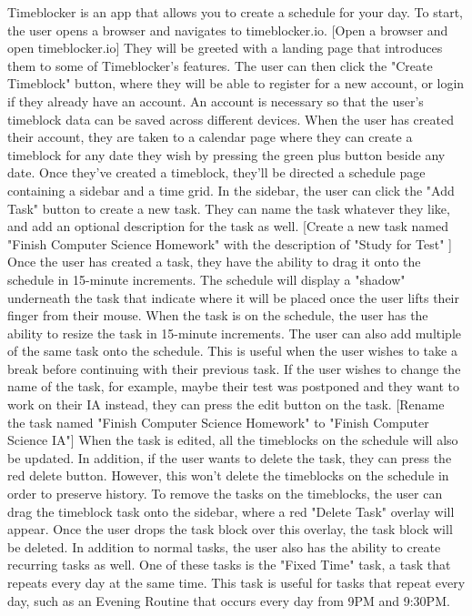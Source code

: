 \documentclass[notitlepage]{report}
\begin{document}
\obeylines
Timeblocker is an app that allows you to create a schedule for your day.
To start, the user opens a browser and navigates to timeblocker.io.
[Open a browser and open timeblocker.io]
They will be greeted with a landing page that introduces them to some of Timeblocker's features.
The user can then click the "Create Timeblock" button, where they will be able to register for a new account, or login if they already have an account.
An account is necessary so that the user's timeblock data can be saved across different devices.
When the user has created their account, they are taken to a calendar page where they can create a timeblock for any date they wish by pressing the green plus button beside any date.
Once they've created a timeblock, they'll be directed a schedule page containing a sidebar and a time grid. In the sidebar, the user can click the "Add Task" button to create a new task. They can name the task whatever they like, and add an optional description for the task as well.
[Create a new task named "Finish Computer Science Homework" with the description of "Study for Test" ]
Once the user has created a task, they have the ability to drag it onto the schedule in 15-minute increments. The schedule will display a "shadow" underneath the task that indicate where it will be placed once the user lifts their finger from their mouse. When the task is on the schedule, the user has the ability to resize the task in 15-minute increments.
The user can also add multiple of the same task onto the schedule. This is useful when the user wishes to take a break before continuing with their previous task.
If the user wishes to change the name of the task, for example, maybe their test was postponed and they want to work on their IA instead, they can press the edit button on the task.
[Rename the task named "Finish Computer Science Homework" to "Finish Computer Science IA"]
When the task is edited, all the timeblocks on the schedule will also be updated.
In addition, if the user wants to delete the task, they can press the red delete button. However, this won't delete the timeblocks on the schedule in order to preserve history. To remove the tasks on the timeblocks, the user can drag the timeblock task onto the sidebar, where a red "Delete Task" overlay will appear. Once the user drops the task block over this overlay, the task block will be deleted.
In addition to normal tasks, the user also has the ability to create recurring tasks as well. One of these tasks is the "Fixed Time" task, a task that repeats every day at the same time. This task is useful for tasks that repeat every day, such as an Evening Routine that occurs every day from 9PM and 9:30PM.
\end{document}
